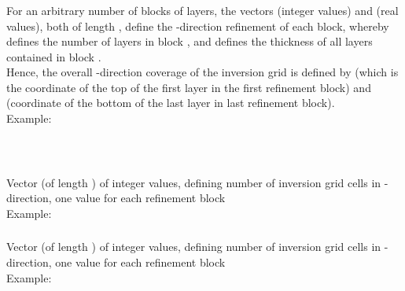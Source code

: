 \subsubsection{}
For an arbitrary number of  blocks of layers,
the vectors  (integer values) and  (real values), 
both of length , define the -direction refinement of each block,
whereby  defines the number of layers in block , and 
 defines the thickness of all layers contained in block .\\
Hence, the overall -direction coverage of the inversion grid is defined by 
 (which is the coordinate of the top of the first layer in the first refinement block)
and  (coordinate of the bottom of the last layer in
last refinement block).\\
Example:\\
\\
\\
\subsubsection{}
Vector (of length ) of integer values, defining number of 
inversion grid cells in -direction, one value for each refinement block\\
Example:\\
\subsubsection{}
Vector (of length ) of integer values, defining number of 
inversion grid cells in -direction, one value for each refinement block\\
Example:\\
